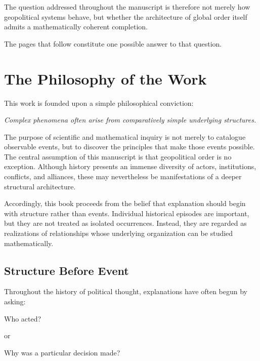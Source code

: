\documentclass[11pt,openany]{book}
\theoremstyle{plain}
\theoremstyle{definition}
\begin{document}
The question addressed throughout the manuscript is therefore not merely how geopolitical systems behave, but whether the architecture of global order itself admits a mathematically coherent completion.

The pages that follow constitute one possible answer to that question.

\chapter*{The Philosophy of the Work}


This work is founded upon a simple philosophical conviction:

\begin{center}
\emph{
Complex phenomena often arise from comparatively simple underlying structures.
}
\end{center}

The purpose of scientific and mathematical inquiry is not merely to catalogue observable events, but to discover the principles that make those events possible. The central assumption of this manuscript is that geopolitical order is no exception. Although history presents an immense diversity of actors, institutions, conflicts, and alliances, these may nevertheless be manifestations of a deeper structural architecture.

Accordingly, this book proceeds from the belief that explanation should begin with structure rather than events. Individual historical episodes are important, but they are not treated as isolated occurrences. Instead, they are regarded as realizations of relationships whose underlying organization can be studied mathematically.

\section*{Structure Before Event}

Throughout the history of political thought, explanations have often begun by asking:

\begin{center}
Who acted?
\end{center}

or

\begin{center}
Why was a particular decision made?
\end{center}
\end{document}
